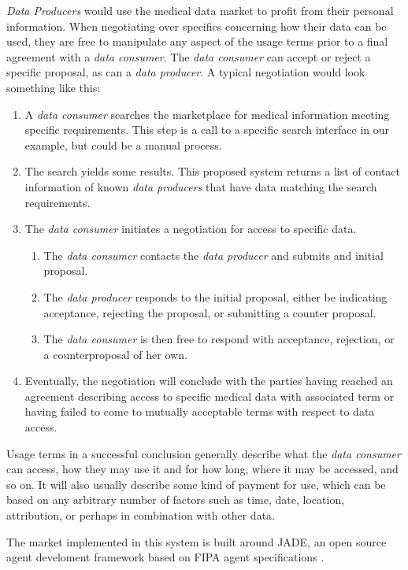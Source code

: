 \documentclass[10pt, conference, compsocconf]{IEEEtran}
\begin{document}
\textit{Data Producers} would use the medical data market to profit from their personal information.  When negotiating over specifics concerning how their data can be used, they are free to manipulate any aspect of the usage terms prior to a final agreement with a \textit{data consumer}.  The \textit{data consumer} can accept or reject a specific proposal, as can a \textit{data producer}.  A typical negotiation would look something like this:
\begin{enumerate}
\item A \textit{data consumer} searches the marketplace for medical information meeting specific requirements.  This step is a call to a specific search interface in our example, but could be a manual process.
\item The search yields some results.  This proposed system returns a list of contact information of known \textit{data producers} that have data matching the search requirements.
\item The \textit{data consumer} initiates a negotiation for access to specific data.
\begin{enumerate}
\item The \textit{data consumer} contacts the \textit{data producer} and submits and initial proposal.
\item The \textit{data producer} responds to the initial proposal, either be indicating acceptance, rejecting the proposal, or submitting a counter proposal.
\item The \textit{data consumer} is then free to respond with acceptance, rejection, or a counterproposal of her own.
\end{enumerate}
\item Eventually, the negotiation will conclude with the parties having reached an agreement describing access to specific medical data with associated term or having failed to come to mutually acceptable terms with respect to data access.  
\end{enumerate}

Usage terms in a successful conclusion generally describe what the \textit{data consumer} can access, how they may use it and for how long, where it may be accessed, and so on.  It will also usually describe some kind of payment for use, which can be based on any arbitrary number of factors such as time, date, location, attribution, or perhaps in combination with other data.

The market implemented in this system is built around JADE, an open source agent develoment framework based on FIPA agent specifications \cite{Emr:Web:Jade,Emr:Web:Fipa}.
\end{document}
